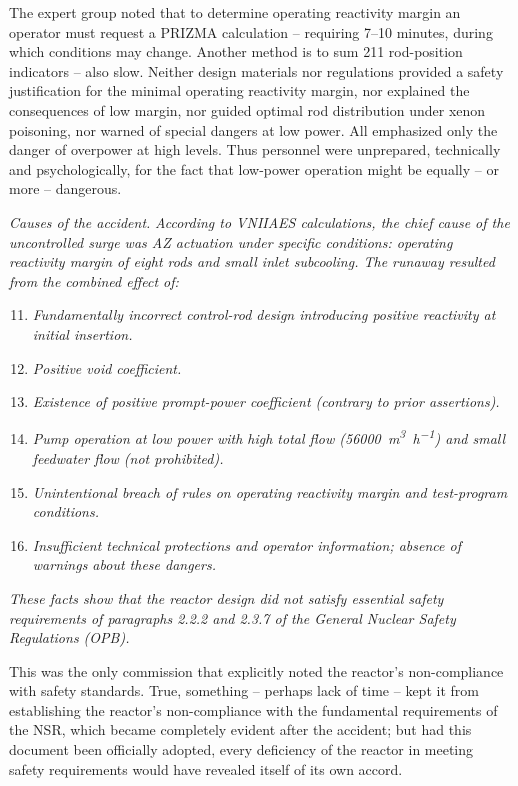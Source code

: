 \documentclass[openright]{bookest}
\begin{document}
The expert group noted that to determine operating reactivity margin an operator must request a PRIZMA calculation -- requiring \numrange{7}{10} minutes, during which conditions may change. Another method is to sum \num{211} rod-position indicators -- also slow. Neither design materials nor regulations provided a safety justification for the minimal operating reactivity margin, nor explained the consequences of low margin, nor guided optimal rod distribution under xenon poisoning, nor warned of special dangers at low power. All emphasized only the danger of overpower at high levels. Thus personnel were unprepared, technically and psychologically, for the fact that low-power operation might be equally -- or more -- dangerous.

\begin{personal}
\textit{Causes of the accident.}  
\textit{According to VNIIAES calculations, the chief cause of the uncontrolled surge was AZ actuation under specific conditions: operating reactivity margin of eight rods and small inlet subcooling. The runaway resulted from the combined effect of:}

\begin{enumerate}
\setcounter{enumi}{10}
\item \textit{Fundamentally incorrect control-rod design introducing positive reactivity at initial insertion.}
\item \textit{Positive void coefficient.}
\item \textit{Existence of positive prompt-power coefficient (contrary to prior assertions).}
\item \textit{Pump operation at low power with high total flow (\qty{56000}{\meter\cubed\per\hour}) and small feedwater flow (not prohibited).}
\item \textit{Unintentional breach of rules on operating reactivity margin and test-program conditions.}
\item \textit{Insufficient technical protections and operator information; absence of warnings about these dangers.}
\end{enumerate}

\textit{These facts show that the reactor design did not satisfy essential safety requirements of paragraphs 2.2.2 and 2.3.7 of the General Nuclear Safety Regulations (OPB).}
\end{personal}

This was the only commission that explicitly noted the reactor's non-compliance with safety standards. True, something -- perhaps lack of time -- kept it from establishing the reactor's non-compliance with the fundamental requirements of the NSR, which became completely evident after the accident; but had this document been officially adopted, every deficiency of the reactor in meeting safety requirements would have revealed itself of its own accord.
\end{document}
